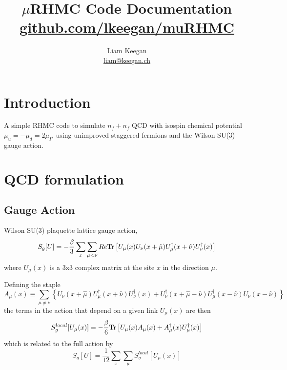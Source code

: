 \documentclass[a4paper,12pt]{article}
\newcommand{\Tr}{{\rm Tr}}
\begin{document}
\author{Liam Keegan\\ \href{mailto:liam@keegan.ch}{liam@keegan.ch}}
\title{$\mu$RHMC Code Documentation \\ \href{https://github.com/lkeegan/muRHMC}{github.com/lkeegan/muRHMC}}

\maketitle

\section{Introduction}
A simple RHMC code to simulate $n_f+n_f$ QCD with isospin chemical potential $\mu_u = -\mu_d = 2 \mu_I$, using unimproved staggered fermions and the Wilson SU(3) gauge action.

\section{QCD formulation}
\subsection{Gauge Action}
Wilson SU(3) plaquette lattice gauge action,
\begin{equation}
 S_g[U] = -\frac{\beta}{3} \sum_x \sum_{\mu<\nu} Re \Tr \left[ U_{\mu}(x)  U_{\nu}(x+\hat\mu)  U_{\mu}^{\dagger}(x+\hat\nu)  U_{\nu}^{\dagger}(x)\right]
\end{equation}
where $U_\mu(x)$ is a 3x3 complex matrix at the site $x$ in the direction $\mu$.

Defining the staple
\begin{equation}
 A_\mu(x) \equiv \sum_{\mu\neq\nu} \left\{
 U_{\nu}(x+\hat\mu) U_{\mu}^{\dagger}(x+\hat\nu)  U_{\nu}^{\dagger}(x) +
 U_{\nu}^{\dagger}(x+\hat\mu-\hat\nu) U_{\mu}^{\dagger}(x-\hat\nu)  U_{\nu}(x-\hat\nu) \right\}
\end{equation}
the terms in the action that depend on a given link $U_{\mu}(x)$ are then
\begin{equation}
 S_g^{local}[U_{\mu}(x)] = -\frac{\beta}{6} \Tr \left[ U_{\mu}(x) A_{\mu}(x) + A_{\mu}^{\dagger}(x)U_{\mu}^{\dagger}(x)  \right]
\end{equation}
which is related to the full action by
\begin{equation}
 S_g[U] = \frac{1}{12} \sum_{x} \sum_{\mu} S_g^{local}[U_{\mu}(x)]
\end{equation}
\end{document}

